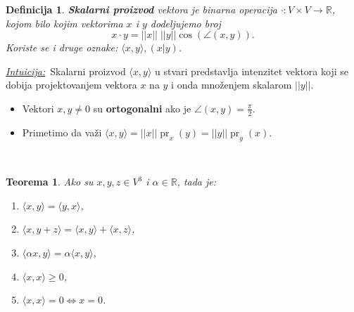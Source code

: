 \documentclass[a4paper,12pt,twoside]{report}
\newtheorem{theorem}{Teorema}[section]
\newtheorem{definition}{Definicija}[section]
\numberwithin{algorithm}{section}
\newcommand{\intuicija}{\noindent\underline{\textit{Intuicija:}}\ }
\begin{document}
\begin{definition}
    \textbf{Skalarni proizvod} vektora je binarna operacija $\cdot:V \times V \to \mathbb{R}$, kojom bilo kojim vektorima $x$ i $y$ dodeljujemo broj
    \[ x\cdot y = ||x|| \; ||y|| \cos(\angle(x, y)). \] Koriste se i druge oznake: $\langle x, y \rangle, (x | y)$.
    \begin{figure}[!h]
\centering
{}
\end{figure}
\end{definition}
\intuicija Skalarni proizvod $\langle x, y \rangle$ u stvari predstavlja intenzitet vektora koji se dobija projektovanjem vektora $x$ na $y$ i onda množenjem skalarom $||y||$.\

\begin{itemize}
    \item Vektori $x, y \neq 0$ su \textbf{ortogonalni} ako je $\displaystyle\angle(x, y) = \frac{\pi}{2}$.
    \item Primetimo da važi $\langle x, y \rangle = ||x||\operatorname{pr}_x(y) = ||y||\operatorname{pr}_y(x)$.
\end{itemize}\

\begin{theorem}
    \label{skP1}
    Ako su $x, y, z \in V^3$ i $\alpha \in \mathbb{R}$, tada je:
    \begin{enumerate}
        \item $\langle x, y \rangle = \langle y, x \rangle$,
        \item $\langle x, y + z \rangle = \langle x, y \rangle + \langle x, z \rangle$,
        \item $\langle \alpha x, y \rangle = \alpha \langle x, y \rangle$,
        \item $\langle x, x \rangle \geq 0$,
        \item $\langle x, x \rangle = 0 \iff x = 0$.
    \end{enumerate}
\end{theorem}\
\end{document}
